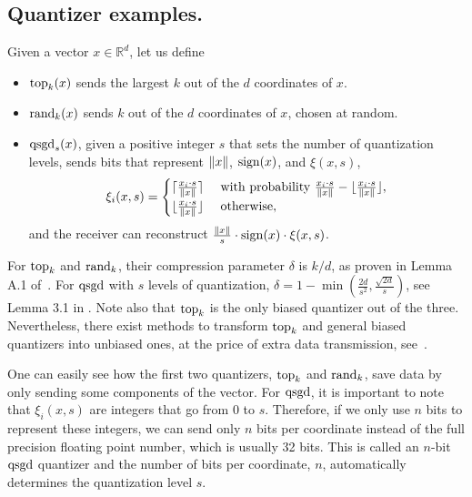 \subsection{Quantizer examples.}
\begin{example} \label{example:quantizers}
    Given a vector $x \in \mathbb{R}^d$, let us define
    \begin{itemize}
        \item $\operatorname{top}_k(x)$ sends the largest $k$ out of the $d$ coordinates of $x$.
        \item $\operatorname{rand}_k(x)$ sends $k$ out of the $d$ coordinates of $x$, chosen at random.
        \item $\operatorname{qsgd}_s(x)$, given a positive integer $s$ that sets the number of quantization levels, sends bits that represent $\left\lVert x\right\rVert$, $\operatorname{sign} (x)$, and $\xi(x, s)$,
              \begin{equation*}
                  \xi_i(x,s) =
                  \begin{cases}
                      \lceil \frac{x_i \cdot s}{\left\lVert x\right\rVert} \rceil   & \text{ with probability } \frac{x_i \cdot s}{\left\lVert x\right\rVert} - \lfloor \frac{x_i \cdot s}{\left\lVert x\right\rVert} \rfloor, \\
                      \lfloor \frac{x_i \cdot s}{\left\lVert x\right\rVert} \rfloor & \text{ otherwise},
                  \end{cases}
              \end{equation*}
              and the receiver can reconstruct $\tfrac{\left\lVert x\right\rVert}{s} \cdot \operatorname{sign} (x) \cdot \xi(x, s)$.
    \end{itemize}
    For $\operatorname{top}_k$ and $\operatorname{rand}_k$, their compression parameter $\delta$ is $k/d$, as proven in Lemma A.1 of~\cite{sparsifiedSGD}.
    For $\operatorname{qsgd}$ with $s$ levels of quantization, $\delta = 1 - \min(\tfrac{2d}{s^2}, \tfrac{\sqrt{2d}}{s})$, see Lemma 3.1 in \cite{qsgd}.
    Note also that $\operatorname{top}_k$ is the only biased quantizer out of the three.
    Nevertheless, there exist methods to transform $\operatorname{top}_k$ and general biased quantizers into unbiased ones, at the price of extra data transmission, see~\cite{unbiased_horvath}.

    One can easily see how the first two quantizers, $\operatorname{top}_k$ and $\operatorname{rand}_k$, save data by only sending some components of the vector.
    For $\operatorname{qsgd}$, it is important to note that $\xi_i(x,s)$ are integers that go from 0 to $s$.
    Therefore, if we only use $n$ bits to represent these integers, we can send only $n$ bits per coordinate instead of the full precision floating point number, which is usually 32 bits.
    This is called an $n$-bit $\operatorname{qsgd}$ quantizer and the number of bits per coordinate, $n$, automatically determines the quantization level $s$.
\end{example}

